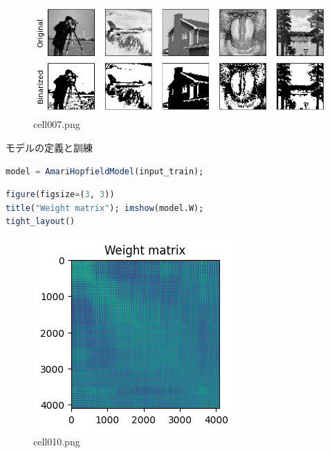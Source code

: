 \begin{figure}[ht]
	\centering
	\includegraphics[scale=0.8, max width=\linewidth]{./fig/energy-based-model/hopfield-model/cell007.png}
	\caption{cell007.png}
	\label{cell007.png}
\end{figure}
モデルの定義と訓練
\begin{lstlisting}[language=julia]
model = AmariHopfieldModel(input_train);
\end{lstlisting}
\begin{lstlisting}[language=julia]
figure(figsize=(3, 3))
title("Weight matrix"); imshow(model.W); 
tight_layout()
\end{lstlisting}
\begin{figure}[ht]
	\centering
	\includegraphics[scale=0.8, max width=\linewidth]{./fig/energy-based-model/hopfield-model/cell010.png}
	\caption{cell010.png}
	\label{cell010.png}
\end{figure}
